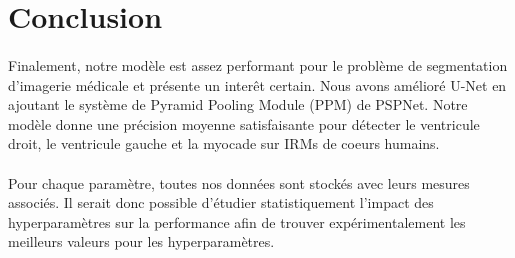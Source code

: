 \documentclass[french, english]{article}
\begin{document}
\section{Conclusion}
\paragraph{}Finalement, notre modèle est assez performant pour le problème de segmentation d'imagerie médicale et présente un interêt certain. Nous avons amélioré U-Net en ajoutant le système de Pyramid Pooling Module (PPM) de PSPNet. Notre modèle donne une précision moyenne satisfaisante pour détecter le ventricule droit, le ventricule gauche et la myocade sur IRMs de coeurs humains. 
\paragraph{}
Pour chaque paramètre, toutes nos données sont stockés avec leurs mesures associés. Il serait donc possible d'étudier statistiquement l'impact des hyperparamètres sur la performance afin de trouver expérimentalement les meilleurs valeurs pour les hyperparamètres.
\end{document}
